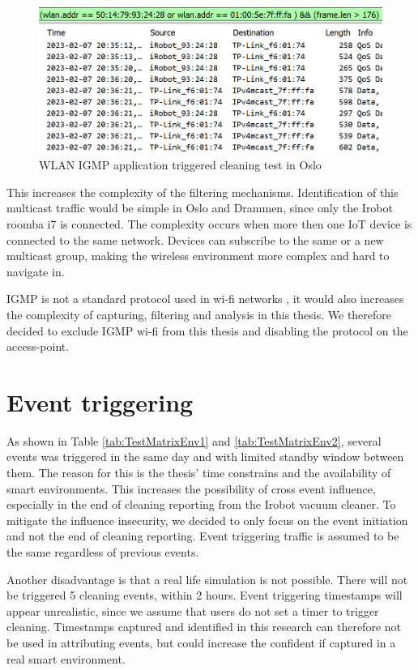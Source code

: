\begin{figure}[H]
    \centering
    \includegraphics[width=\textwidth]{figures/WLAN_IGMP_ALL.png}
    \caption{WLAN IGMP application triggered cleaning test in Oslo}
    \label{fig:WLANIGMP_all_enabled}
\end{figure}

This increases the complexity of the filtering mechanisms. Identification of this multicast traffic would be simple in Oslo and Drammen, since only the Irobot roomba i7 is connected. The complexity occurs when more then one IoT device is connected to the same network. Devices can subscribe to the same or a new multicast group, making the wireless environment more complex and hard to navigate in. 

IGMP is not a standard protocol used in wi-fi networks \cite{wifi_ieee80211}, it would also increases the complexity of capturing, filtering and analysis in this thesis. We therefore decided to exclude IGMP wi-fi from this thesis and disabling the protocol on the access-point. 

\section{Event triggering}
As shown in Table \ref{tab:TestMatrixEnv1} and \ref{tab:TestMatrixEnv2}, several events was triggered in the same day and with limited standby window between them. The reason for this is the thesis' time constrains and the availability of smart environments. This increases the possibility of cross event influence, especially in the end of cleaning reporting from the Irobot vacuum cleaner. To mitigate the influence insecurity, we decided to only focus on the event initiation and not the end of cleaning reporting. Event triggering traffic is assumed to be the same regardless of previous events. 

Another disadvantage is that a real life simulation is not possible. There will not be triggered 5 cleaning events, within 2 hours. Event triggering timestamps will appear unrealistic, since we assume that users do not set a timer to trigger cleaning. Timestamps captured and identified in this research can therefore not be used in attributing events, but could increase the confident if captured in a real smart environment. 

